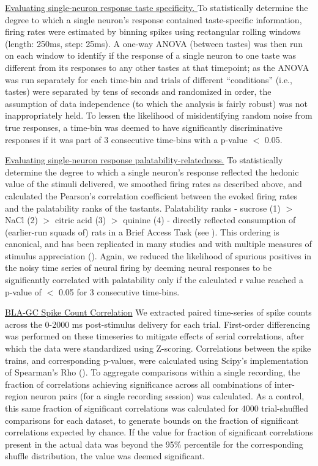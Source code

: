 \begin{refsection}
\noindent\underline{Evaluating single-neuron response taste specificity. }
To statistically determine the degree to which a single neuron’s response contained taste-specific information, firing rates were estimated by binning spikes using rectangular rolling windows (length: 250ms, step: 25ms). A one-way ANOVA (between tastes) was then run on each window to identify if the response of a single neuron to one taste was different from its responses to any other tastes at that timepoint; as the ANOVA was run separately for each time-bin and trials of different “conditions” (i.e., tastes) were separated by tens of seconds and randomized in order, the assumption of data independence (to which the analysis is fairly robust) was not inappropriately held. To lessen the likelihood of misidentifying random noise from true responses, a time-bin was deemed to have significantly discriminative responses if it was part of 3 consecutive time-bins with a p-value \(<\) 0.05.

\noindent\underline{Evaluating single-neuron response palatability-relatedness.} To statistically determine the degree to which a single neuron’s response reflected the hedonic value of the stimuli delivered, we smoothed firing rates as described above, and calculated the Pearson’s correlation coefficient between the evoked firing rates and the palatability ranks of the tastants. Palatability ranks - sucrose (1) \(>\) NaCl (2) \(>\) citric acid (3) \(>\) quinine (4) - directly reflected consumption of (earlier-run squads of) rats in a Brief Access Task (see \cite{sadacca2012a}). This ordering is canonical, and has been replicated in many studies and with multiple measures of stimulus appreciation (\cite{travers1986a,clarke1998a,fontanini2006a}). Again, we reduced the likelihood of spurious positives in the noisy time series of neural firing by deeming neural responses to be significantly correlated with palatability only if the calculated r value reached a p-value of \(<\) 0.05 for 3 consecutive time-bins.

\noindent\underline{BLA-GC Spike Count Correlation}
We extracted paired time-series of spike counts across the 0-2000 ms post-stimulus delivery for each trial. First-order differencing was performed on these timeseries to mitigate effects of serial correlations, after which the data were standardized using Z-scoring. Correlations between the spike trains, and corresponding p-values, were calculated using Scipy’s implementation of Spearman’s Rho (\cite{p2020a}). To aggregate comparisons within a single recording, the fraction of correlations achieving significance across all combinations of inter-region neuron pairs (for a single recording session) was calculated. As a control, this same fraction of significant correlations was calculated for 4000 trial-shuffled comparisons for each dataset, to generate bounds on the fraction of significant correlations expected by chance. If the value for fraction of significant correlations present in the actual data was beyond the 95\% percentile for the corresponding shuffle distribution, the value was deemed significant. 


\end{refsection}
